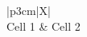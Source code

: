﻿\documentclass[10pt]{article}
\begin{document}
\begin{tabularx}{\linewidth}{|p{3cm}|X|}
\hline
{} \\
\hline
Cell 1 & Cell 2 \\
\hline
\end{tabularx}
\end{document}

